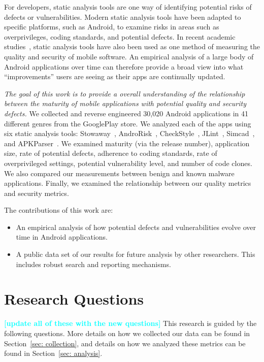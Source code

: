 \documentclass[conference]{IEEEtran}
\newcommand{\todo}[1]{\textcolor{cyan}{\textbf{[#1]}}}
\begin{document}
For developers, static analysis tools are one way of identifying potential risks of defects or vulnerabilities. Modern static analysis tools have been adapted to specific platforms, such as Android, to examine risks in areas such as overprivileges, coding standards, and potential defects. In recent academic studies~\cite{Felt:2011:APD:2046707.2046779,Vidas11curbingandroid,Lee_2013}, static analysis tools have also been used as one method of measuring the quality and security of mobile software. An empirical analysis of a large body of Android applications over time can therefore provide a broad view into what ``improvements'' users are seeing as their apps are continually updated.

\emph{The goal of this work is to provide a overall understanding of the relationship between the maturity of mobile applications with potential quality and security defects.} We collected and reverse engineered 30,020 Android applications in 41 different genres from the GooglePlay store. We analyzed each of the apps using six static analysis tools: Stowaway~\cite{Felt:2011:APD:2046707.2046779}, AndroRisk~\cite{androguard_url}, CheckStyle~\cite{checkstyle_key}, JLint~\cite{jlint_key}, Simcad~\cite{6613857}, and APKParser~\cite{apkparser_link}.  We examined maturity (via the release number), application size, rate of potential defects, adherence to coding standards, rate of overprivileged settings, potential vulnerability level, and number of code clones. We also compared our measurements between benign and known malware applications. Finally, we examined the relationship between our quality metrics and security metrics.

The contributions of this work are:

\begin{itemize}
  \item An empirical analysis of how potential defects and vulnerabilities evolve over time in Android applications.
  \item A public data set of our results for future analysis by other researchers. This includes robust search and reporting mechanisms.
\end{itemize}

\section {Research Questions}
\todo{update all of these with the new questions}
This research is guided by the following questions. More details on how we collected our data can be found in Section~\ref{sec: collection}, and details on how we analyzed these metrics can be found in Section~\ref{sec: analysis}.
\end{document}
